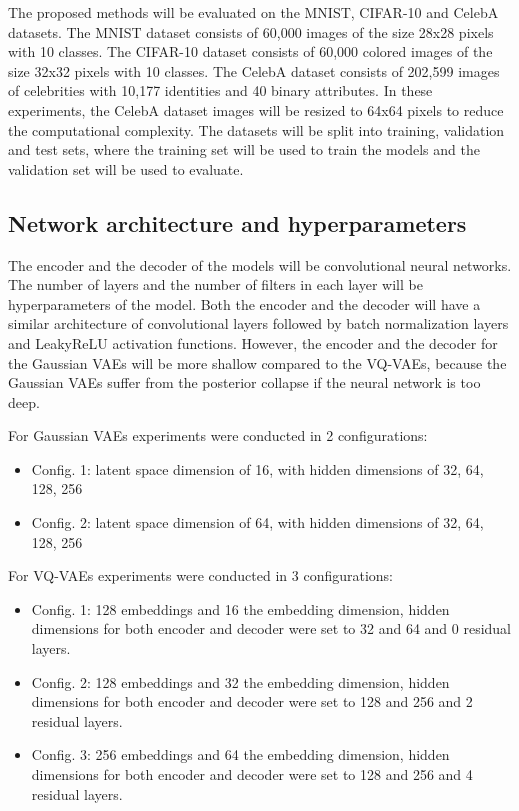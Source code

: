 The proposed methods will be evaluated on the MNIST, CIFAR-10 and CelebA datasets. The MNIST dataset consists of 60,000 images of the size 28x28 pixels with 10 classes. The CIFAR-10 dataset consists of 60,000 colored images of the size 32x32 pixels with 10 classes.
The CelebA dataset consists of 202,599 images of celebrities with 10,177 identities and 40 binary attributes. In these experiments, the CelebA dataset images will be resized to 64x64 pixels to reduce the computational complexity.
The datasets will be split into training, validation and test sets, where the training set will be used to train the models and the validation set will be used to evaluate.

\subsection{Network architecture and hyperparameters}

The encoder and the decoder of the models will be convolutional neural networks. The number of layers and the number of filters in each layer will be hyperparameters of the model. Both the encoder and the decoder will have a similar architecture of convolutional layers followed by batch normalization layers and LeakyReLU activation functions. However, the encoder and the decoder for the Gaussian VAEs will be more shallow compared to the VQ-VAEs, because the Gaussian VAEs suffer from the posterior collapse if the neural network is too deep. 

For Gaussian VAEs experiments were conducted in 2 configurations:

\begin{itemize}
    \item Config. 1: latent space dimension of 16, with hidden dimensions of 32, 64, 128, 256
    \item Config. 2: latent space dimension of 64, with hidden dimensions of 32, 64, 128, 256
\end{itemize}

For VQ-VAEs experiments were conducted in 3 configurations:

\begin{itemize}
    \item Config. 1: 128 embeddings and 16 the embedding dimension, hidden dimensions for both encoder and decoder were set to 32 and 64 and 0 residual layers.
    \item Config. 2: 128 embeddings and 32 the embedding dimension, hidden dimensions for both encoder and decoder were set to 128 and 256 and 2 residual layers.
    \item Config. 3: 256 embeddings and 64 the embedding dimension, hidden dimensions for both encoder and decoder were set to 128 and 256 and 4 residual layers.
\end{itemize}

